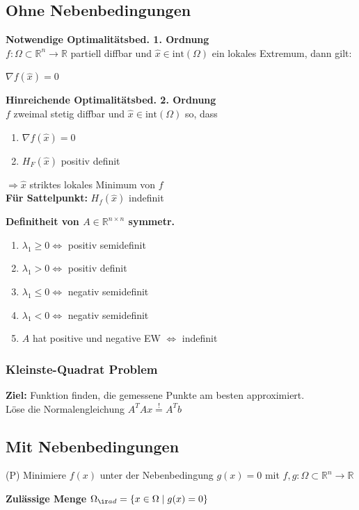 \subsection{Ohne Nebenbedingungen}
\textbf{Notwendige Optimalitätsbed. 1. Ordnung} \\
$f : \Omega \subset \mathbb R^n \rightarrow \mathbb R$ partiell diffbar und $\hat{x} \in \text{int}(\Omega)$ ein lokales Extremum, dann gilt:
\begin{center}
    $\nabla f(\hat x)=0$
\end{center}
\vspace{.5em}

\textbf{Hinreichende Optimalitätsbed. 2. Ordnung} \\
$f$ zweimal stetig diffbar und $\hat x \in \text{int}(\Omega)$ so, dass
\begin{enumerate}
    \item $\nabla f(\hat x)=0$
    \item $H_F(\hat x)$ positiv definit
\end{enumerate}
$\Longrightarrow \hat x$ striktes lokales Minimum von $f$ \\

\textbf{Für Sattelpunkt: } $H_f(\hat x)$ indefinit
\vspace{.5em}

\textbf{Definitheit von $A \in \mathbb R^{n\times n}$ symmetr.}
\begin{enumerate}
    \item $\lambda_1 \ge 0 \Leftrightarrow$ positiv semidefinit
    \item $\lambda_1 > 0 \Leftrightarrow$ positiv definit
    \item $\lambda_1 \le 0 \Leftrightarrow$ negativ semidefinit
    \item $\lambda_1 < 0 \Leftrightarrow$ negativ semidefinit
    \item $A$ hat positive und negative EW $\Leftrightarrow$ indefinit
\end{enumerate}

\subsubsection{Kleinste-Quadrat Problem}
\textbf{Ziel:} Funktion finden, die gemessene Punkte am besten approximiert. \\
Löse die Normalengleichung $A^TAx \stackrel{!}{=} A^Tb$


\subsection{Mit Nebenbedingungen}
\begin{sectionbox}
    (P) Minimiere $f(x)$ unter der Nebenbedingung $g(x)=0$ mit $f,g : \Omega \subset \mathbb R^n \rightarrow \mathbb R$
\end{sectionbox}
\textbf{Zulässige Menge} $\Omega_{\ir ad}=\{x \in \Omega \; | \; g(x)=0 \}$

